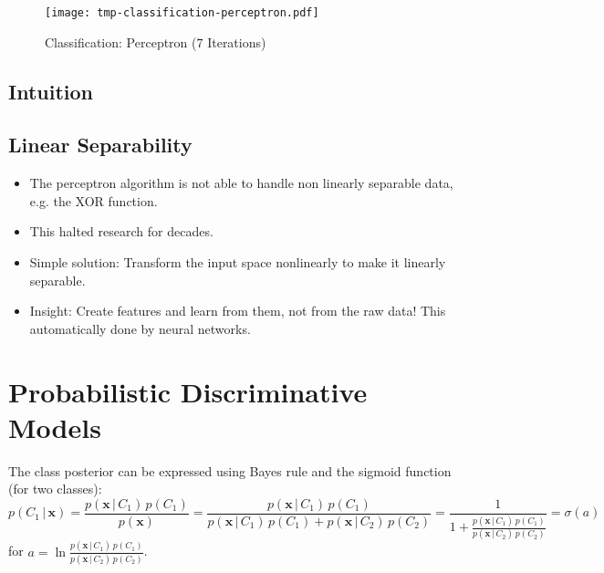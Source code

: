 \documentclass[a4paper, 11pt, accentcolor = tud3b]{tudreport}
\newcommand{\given}{\ensuremath{\,\vert\,}}
\renewcommand{\vec}[1]{\mathbf{#1}}
\begin{document}
				\begin{figure}
					\centering
					\texttt{[image: tmp-classification-perceptron.pdf]}
					\caption{Classification: Perceptron (\(7\) Iterations)}
					\label{fig:perceptronExample}
				\end{figure}

			\subsection{Intuition} %

			\subsection{Linear Separability}
				\begin{itemize}
					\item The perceptron algorithm is not able to handle non linearly separable data, e.g. the XOR function.
					\item This halted research for decades.
					\item Simple solution: Transform the input space nonlinearly to make it linearly separable.
					\item Insight: Create features and learn from them, not from the raw data! This automatically done by neural networks.
				\end{itemize}

		\section{Probabilistic Discriminative Models}
			The class posterior can be expressed using Bayes rule and the sigmoid function (for two classes):
			\begin{equation}
				p(C_1 \given \vec{x}) = \frac{p(\vec{x} \given C_1) \, p(C_1)}{p(\vec{x})} = \frac{p(\vec{x} \given C_1) \, p(C_1)}{p(\vec{x} \given C_1) \, p(C_1) + p(\vec{x} \given C_2) \, p(C_2)} = \frac{1}{1 + \frac{p(\vec{x} \given C_1) \, p(C_1)}{p(\vec{x} \given C_2) \, p(C_2)}} = \sigma(a)
			\end{equation}
			for \( a = \ln \frac{p(\vec{x} \given C_1) \, p(C_1)}{p(\vec{x} \given C_2) \, p(C_2)} \).
\end{document}
